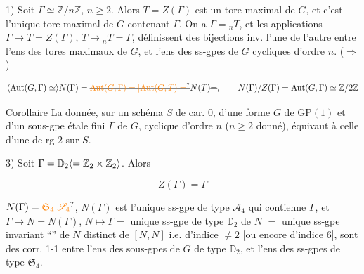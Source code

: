1) Soit $\Gamma\simeq\mathbb Z/n\mathbb Z$, $n\geq2$. Alors
$T=Z(\Gamma)$ est un tore maximal de $G$, et c'est l'unique
tore maximal de $G$ contenant $\Gamma$. On a  $\Gamma={}_nT$,
et les applications $\Gamma\mapsto T=Z(\Gamma)$, $T\mapsto{}_nT=\Gamma$,
définissent des bijections inv. l'une de l'autre
entre l'ens des tores maximaux de
$G$, et l'ens des ss-gpes de $G$ 
cycliques d'ordre $n$. \quad ($\Rightarrow$)


\[
\inserted{\mathrm{Aut}(G,\Gamma)\simeq}N(\Gamma)=\deleted{\unsure{\mathrm{Aut}(G,\Gamma)=|\mathrm{Aut}(G,T)=}}N(T)\deleted{=},\qquad N(\Gamma)/Z(\Gamma)=\mathrm{Aut}(G,\Gamma)\simeq\mathbb Z/2\mathbb Z
\]



\uline{Corollaire} La donnée, sur un schéma $S$ de car. 0, d'une
forme $G$ de $\mathrm{GP}(1)$ et d'un sous-gpe étale fini $\Gamma$ de $G$,
cyclique d'ordre $n$ ($n\geq2$ donné), équivaut à celle d'une 
  de rg 2 sur $S$.


3) Soit $\Gamma=\mathbb D_2\inserted{=\mathbb Z_2\times\mathbb Z_2}$. Alors

\[
Z(\Gamma)=\Gamma
\]

$N(\Gamma)=\unsure{\mathfrak S_4|\mathscr S_4}$, $N(\Gamma)$ est l'unique ss-gpe de type
$\mathcal A_4$ qui contienne $\Gamma$, et $\Gamma\mapsto N=N(\Gamma)$,
$N\longmapsto\Gamma={}$ unique ss-gpe de type $\mathbb D_{2}$ de
$N$ $={}$ unique ss-gpe invariant ``'' 
de $N$ distinct de $[N,N]$ i.e. d'indice
$\ne2$ [ou encore d'indice 6], sont des
corr. 1-1 entre l'ens des sous-gpes
de $G$ de type $\mathbb D_2$, et l'ens des ss-gpes de type $\mathfrak S_4$.

